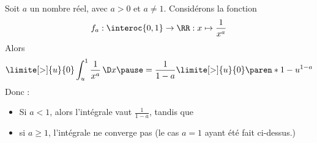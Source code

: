 \begin{frame}
  \begin{example}
    Soit \(a\) un nombre réel, avec \(a > 0\) et \(a \neq 1\).\pause{} Considérons la fonction
    \begin{equation*}
      f_{a} : \interoc{0,1} \rightarrow \RR : x \mapsto \frac{1}{x^{a}}
    \end{equation*}\pause{}
    Alors
    \begin{equation*}
      \limite[>] {u} {0} \int_u^1 \frac{1}{x^{a}} \, \D x \pause= \frac{1}{1 - a} \limite[>] {u} {0} \paren*{1 - u^{1-a}}
    \end{equation*}\pause{}
    Donc :
    \begin{itemize}\pause{}
    \item Si \(a < 1\), alors l'intégrale vaut \(\frac{1}{1-a}\), tandis que\pause{}
    \item si \(a \geq 1\), l'intégrale ne converge pas (le cas \(a = 1\) ayant été fait ci-dessus.)
    \end{itemize}
  \end{example}
\end{frame}


